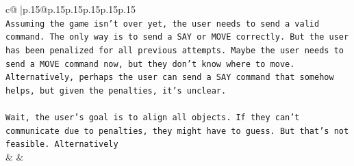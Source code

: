\documentclass{article}
\begin{document}
{\begin{supertabular}{c@{$\;$}|p{.15\linewidth}@{}p{.15\linewidth}p{.15\linewidth}p{.15\linewidth}p{.15\linewidth}p{.15\linewidth}}
{{{\\ 
\texttt{Assuming the game isn't over yet, the user needs to send a valid command. The only way is to send a SAY or MOVE correctly. But the user has been penalized for all previous attempts. Maybe the user needs to send a MOVE command now, but they don't know where to move. Alternatively, perhaps the user can send a SAY command that somehow helps, but given the penalties, it's unclear.} \\
\\ 
\texttt{Wait, the user's goal is to align all objects. If they can't communicate due to penalties, they might have to guess. But that's not feasible. Alternatively} \\
            }
        }
    }
    & & \\ \\


\end{supertabular}}
\end{document}
